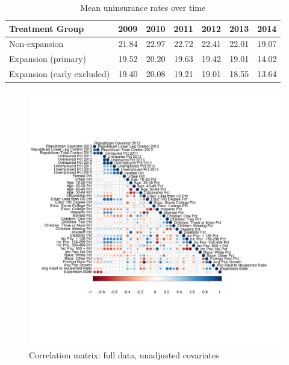 \begin{table}[ht]
\centering
\caption{Mean uninsurance rates over time}\label{tab:timetrends}
\begin{tabular}{lrrrrrr}
  \hline
Treatment Group & 2009 & 2010 & 2011 & 2012 & 2013 & 2014 \\ 
  \hline
Non-expansion & 21.84 & 22.97 & 22.72 & 22.41 & 22.01 & 19.07 \\ 
  Expansion (primary) & 19.52 & 20.20 & 19.63 & 19.42 & 19.01 & 14.02 \\ 
  Expansion (early excluded) & 19.40 & 20.08 & 19.21 & 19.01 & 18.55 & 13.64 \\ 
   \hline
\end{tabular}
\end{table}

\begin{figure}[h!]
\begin{center}
    \caption{Correlation matrix: full data, unadjusted covariates}
    \label{fig:corrmatrix}
    \includegraphics[scale=0.25]{01_Plots/correlation-plot-c1-sigma-zero.png}
\end{center}
\end{figure}

\clearpage